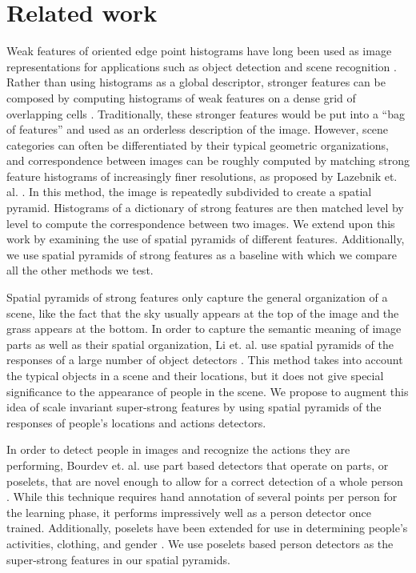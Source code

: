 \documentclass[11pt]{article}
\begin{document}
\section{Related work}

Weak features of oriented edge point histograms have long been used as image representations for applications such as object detection and scene recognition \cite{sift} \cite{gist}. Rather than using histograms as a global descriptor, stronger features can be composed by computing histograms of weak features on a dense grid of overlapping cells \cite{HOG}. Traditionally, these stronger features would be put into a ``bag of features'' and used as an orderless description of the image. However, scene categories can often be differentiated by their typical geometric organizations, and correspondence between images can be roughly computed by matching strong feature histograms of increasingly finer resolutions, as proposed by Lazebnik et. al. \cite{beyond_bags}. In this method, the image is repeatedly subdivided to create a spatial pyramid. Histograms of a dictionary of strong features are then matched level by level to compute the correspondence between two images. We extend upon this work by examining the use of spatial pyramids of different features. Additionally, we use spatial pyramids of strong features as a baseline with which we compare all the other methods we test. 

Spatial pyramids of strong features only capture the general organization of a scene, like the fact that the sky usually appears at the top of the image and the grass appears at the bottom. In order to capture the semantic meaning of image parts as well as their spatial organization, Li et. al. use spatial pyramids of the responses of a large number of object detectors \cite{object_bank}. This method takes into account the typical objects in a scene and their locations, but it does not give special significance to the appearance of people in the scene. We propose to augment this idea of scale invariant super-strong features by using spatial pyramids of the responses of people's locations and actions detectors. 	

In order to detect people in images and recognize the actions they are performing, Bourdev et. al. use part based detectors that operate on parts, or poselets, that are novel enough to allow for a correct detection of a whole person \cite{poselets}. While this technique requires hand annotation of several points per person for the learning phase, it performs impressively well as a person detector once trained. Additionally, poselets have been extended for use in determining people's activities, clothing, and gender \cite{poselets_actions}. We use poselets based person detectors as the super-strong features in our spatial pyramids.
\end{document}

